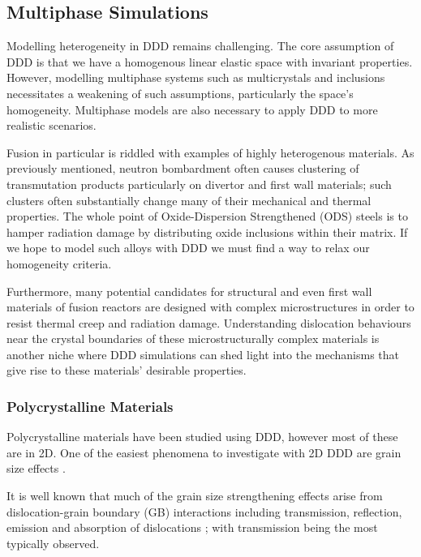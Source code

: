 \subsection{Multiphase Simulations}
\label{ss:multiphase}
%
Modelling heterogeneity in DDD remains challenging. The core assumption of DDD is that we have a homogenous linear elastic space with invariant properties. However, modelling multiphase systems such as multicrystals and inclusions necessitates a weakening of such assumptions, particularly the space's homogeneity. Multiphase models are also necessary to apply DDD to more realistic scenarios.

Fusion in particular is riddled with examples of highly heterogenous materials. As previously mentioned, neutron bombardment often causes clustering of transmutation products particularly on divertor and first wall materials; such clusters often substantially change many of their mechanical and thermal properties. The whole point of Oxide-Dispersion Strengthened (ODS) steels \cite{ddd_ods} is to hamper radiation damage by distributing oxide inclusions within their matrix. If we hope to model such alloys with DDD we must find a way to relax our homogeneity criteria.

Furthermore, many potential candidates for structural and even first wall materials of fusion reactors are designed with complex microstructures in order to resist thermal creep and radiation damage. Understanding dislocation behaviours near the crystal boundaries of these microstructurally complex materials is another niche where DDD simulations can shed light into the mechanisms that give rise to these materials' desirable properties.

\subsubsection{Polycrystalline Materials}
\label{ss:polycrystal}
Polycrystalline materials have been studied using DDD, however most of these are in 2D. One of the easiest phenomena to investigate with 2D DDD are grain size effects \cite{2d_pcm, 2d_pcm2}.

It is well known that much of the grain size strengthening effects arise from dislocation-grain boundary (GB) interactions including transmission, reflection, emission and absorption of dislocations \cite{grain_size_eff1, grain_size_eff2}; with transmission being the most typically observed.

